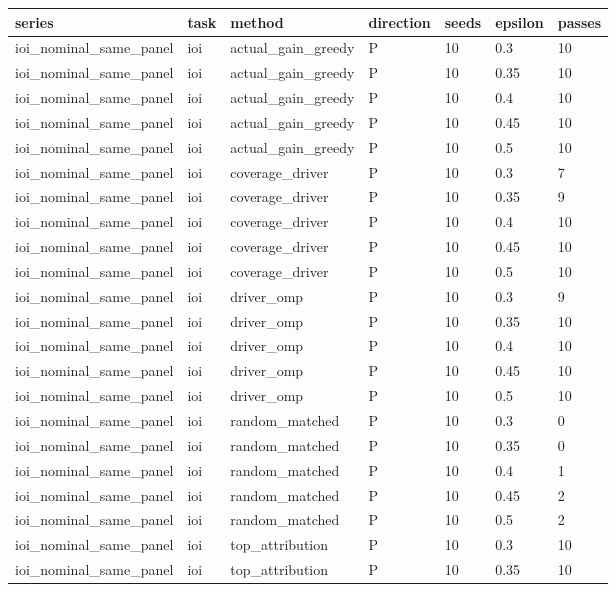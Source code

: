 \begin{tabular}{lllllll}
\toprule
series & task & method & direction & seeds & epsilon & passes \\
\midrule
ioi\_nominal\_same\_panel & ioi & actual\_gain\_greedy & P & 10 & 0.3 & 10 \\
ioi\_nominal\_same\_panel & ioi & actual\_gain\_greedy & P & 10 & 0.35 & 10 \\
ioi\_nominal\_same\_panel & ioi & actual\_gain\_greedy & P & 10 & 0.4 & 10 \\
ioi\_nominal\_same\_panel & ioi & actual\_gain\_greedy & P & 10 & 0.45 & 10 \\
ioi\_nominal\_same\_panel & ioi & actual\_gain\_greedy & P & 10 & 0.5 & 10 \\
ioi\_nominal\_same\_panel & ioi & coverage\_driver & P & 10 & 0.3 & 7 \\
ioi\_nominal\_same\_panel & ioi & coverage\_driver & P & 10 & 0.35 & 9 \\
ioi\_nominal\_same\_panel & ioi & coverage\_driver & P & 10 & 0.4 & 10 \\
ioi\_nominal\_same\_panel & ioi & coverage\_driver & P & 10 & 0.45 & 10 \\
ioi\_nominal\_same\_panel & ioi & coverage\_driver & P & 10 & 0.5 & 10 \\
ioi\_nominal\_same\_panel & ioi & driver\_omp & P & 10 & 0.3 & 9 \\
ioi\_nominal\_same\_panel & ioi & driver\_omp & P & 10 & 0.35 & 10 \\
ioi\_nominal\_same\_panel & ioi & driver\_omp & P & 10 & 0.4 & 10 \\
ioi\_nominal\_same\_panel & ioi & driver\_omp & P & 10 & 0.45 & 10 \\
ioi\_nominal\_same\_panel & ioi & driver\_omp & P & 10 & 0.5 & 10 \\
ioi\_nominal\_same\_panel & ioi & random\_matched & P & 10 & 0.3 & 0 \\
ioi\_nominal\_same\_panel & ioi & random\_matched & P & 10 & 0.35 & 0 \\
ioi\_nominal\_same\_panel & ioi & random\_matched & P & 10 & 0.4 & 1 \\
ioi\_nominal\_same\_panel & ioi & random\_matched & P & 10 & 0.45 & 2 \\
ioi\_nominal\_same\_panel & ioi & random\_matched & P & 10 & 0.5 & 2 \\
ioi\_nominal\_same\_panel & ioi & top\_attribution & P & 10 & 0.3 & 10 \\
ioi\_nominal\_same\_panel & ioi & top\_attribution & P & 10 & 0.35 & 10 \\

\end{tabular}
